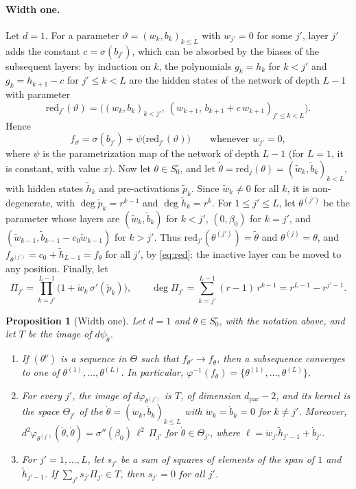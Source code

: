 \documentclass[11pt]{article}
\newtheorem{proposition}[lemma]{Proposition}
\theoremstyle{definition}
\theoremstyle{remark}
\newcommand{\dpar}{d_{\mathrm{par}}}
\begin{document}
\paragraph{Width one.} Let $d=1$. For a parameter $\vartheta=(w_k,b_k)_{k\le L}$ with $w_{j'}=0$ for some $j'$, layer $j'$ adds the constant $c=\sigma(b_{j'})$, which can be absorbed by the biases of the subsequent layers: by induction on $k$, the polynomials $g_k=h_k$ for $k<j'$ and $g_k=h_{k+1}-c$ for $j'\le k<L$ are the hidden states of the network of depth $L-1$ with parameter
\[
\mathrm{red}_{j'}(\vartheta)=\big((w_k,b_k)_{k<j'},\ (w_{k+1},\,b_{k+1}+c\,w_{k+1})_{j'\le k<L}\big).
\]
Hence
\begin{equation}\label{eq:red}
f_\vartheta=\sigma(b_{j'})+\psi\big(\mathrm{red}_{j'}(\vartheta)\big)\qquad\text{whenever }w_{j'}=0,
\end{equation}
where $\psi$ is the parametrization map of the network of depth $L-1$ (for $L=1$, it is constant, with value $x$). Now let $\theta\in S_0^\circ$, and let $\tilde\theta=\mathrm{red}_j(\theta)=(\tilde w_k,\tilde b_k)_{k<L}$, with hidden states $\tilde h_k$ and pre-activations $\tilde p_k$. Since $\tilde w_k\ne0$ for all $k$, it is non-degenerate, with $\deg\tilde p_k=r^{k-1}$ and $\deg\tilde h_k=r^k$. For $1\le j'\le L$, let $\theta^{(j')}$ be the parameter whose layers are $(\tilde w_k,\tilde b_k)$ for $k<j'$, $(0,\beta_0)$ for $k=j'$, and $(\tilde w_{k-1},\tilde b_{k-1}-c_0\tilde w_{k-1})$ for $k>j'$. Thus $\mathrm{red}_{j'}(\theta^{(j')})=\tilde\theta$ and $\theta^{(j)}=\theta$, and $f_{\theta^{(j')}}=c_0+\tilde h_{L-1}=f_\theta$ for all $j'$, by \eqref{eq:red}: the inactive layer can be moved to any position. Finally, let
\[
\Pi_{j'}=\prod_{k=j'}^{L-1}\big(1+\tilde w_k\,\sigma'(\tilde p_k)\big),\qquad\deg\Pi_{j'}=\sum_{k=j'}^{L-1}(r-1)\,r^{k-1}=r^{L-1}-r^{j'-1}.
\]

\begin{proposition}[Width one]\label{prop:one}
Let $d=1$ and $\theta\in S_0^\circ$, with the notation above, and let $T$ be the image of $d\psi_{\tilde\theta}$.
\begin{enumerate}[label=\textup{(\alph*)},nosep]
\item If $(\theta^\nu)$ is a sequence in $\Theta$ such that $f_{\theta^\nu}\to f_\theta$, then a subsequence converges to one of $\theta^{(1)},\dots,\theta^{(L)}$. In particular, $\varphi^{-1}(f_\theta)=\{\theta^{(1)},\dots,\theta^{(L)}\}$.
\item For every $j'$, the image of $d\varphi_{\theta^{(j')}}$ is $T$, of dimension $\dpar-2$, and its kernel is the space $\Theta_{j'}$ of the $\dot\theta=(\dot w_k,\dot b_k)_{k\le L}$ with $\dot w_k=\dot b_k=0$ for $k\ne j'$. Moreover, $d^2\varphi_{\theta^{(j')}}(\dot\theta,\dot\theta)=\sigma''(\beta_0)\,\ell^2\,\Pi_{j'}$ for $\dot\theta\in\Theta_{j'}$, where $\ell=\dot w_{j'}\tilde h_{j'-1}+\dot b_{j'}$.
\item For $j'=1,\dots,L$, let $s_{j'}$ be a sum of squares of elements of the span of $1$ and $\tilde h_{j'-1}$. If $\sum_{j'}s_{j'}\Pi_{j'}\in T$, then $s_{j'}=0$ for all $j'$.
\end{enumerate}
\end{proposition}
\end{document}
